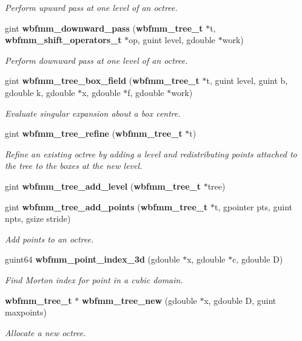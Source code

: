 \begin{DoxyCompactItemize}
\begin{DoxyCompactList}\small\item\em Perform upward pass at one level of an octree. \end{DoxyCompactList}\item 
gint {\bf wbfmm\+\_\+downward\+\_\+pass} ({\bf wbfmm\+\_\+tree\+\_\+t} $\ast$t, {\bf wbfmm\+\_\+shift\+\_\+operators\+\_\+t} $\ast$op, guint level, gdouble $\ast$work)
\begin{DoxyCompactList}\small\item\em Perform downward pass at one level of an octree. \end{DoxyCompactList}\item 
gint {\bf wbfmm\+\_\+tree\+\_\+box\+\_\+field} ({\bf wbfmm\+\_\+tree\+\_\+t} $\ast$t, guint level, guint b, gdouble k, gdouble $\ast$x, gdouble $\ast$f, gdouble $\ast$work)
\begin{DoxyCompactList}\small\item\em Evaluate singular expansion about a box centre. \end{DoxyCompactList}\item 
gint {\bf wbfmm\+\_\+tree\+\_\+refine} ({\bf wbfmm\+\_\+tree\+\_\+t} $\ast$t)
\begin{DoxyCompactList}\small\item\em Refine an existing octree by adding a level and redistributing points attached to the tree to the boxes at the new level. \end{DoxyCompactList}\item 
gint {\bf wbfmm\+\_\+tree\+\_\+add\+\_\+level} ({\bf wbfmm\+\_\+tree\+\_\+t} $\ast$tree)
\item 
gint {\bf wbfmm\+\_\+tree\+\_\+add\+\_\+points} ({\bf wbfmm\+\_\+tree\+\_\+t} $\ast$t, gpointer pts, guint npts, gsize stride)
\begin{DoxyCompactList}\small\item\em Add points to an octree. \end{DoxyCompactList}\item 
guint64 {\bf wbfmm\+\_\+point\+\_\+index\+\_\+3d} (gdouble $\ast$x, gdouble $\ast$c, gdouble D)
\begin{DoxyCompactList}\small\item\em Find Morton index for point in a cubic domain. \end{DoxyCompactList}\item 
{\bf wbfmm\+\_\+tree\+\_\+t} $\ast$ {\bf wbfmm\+\_\+tree\+\_\+new} (gdouble $\ast$x, gdouble D, guint maxpoints)
\begin{DoxyCompactList}\small\item\em Allocate a new octree. \end{DoxyCompactList}\item 

\end{DoxyCompactItemize}

